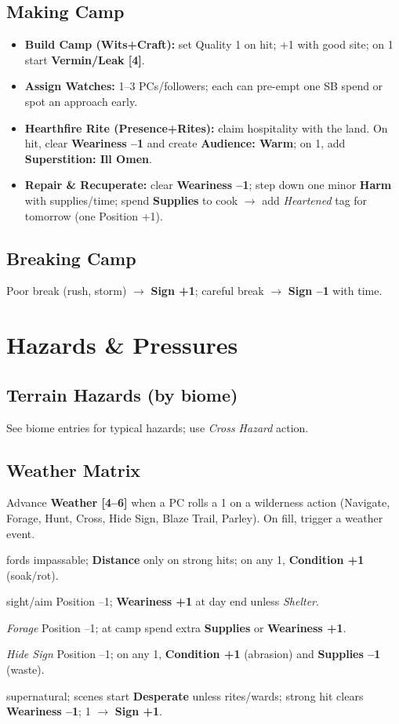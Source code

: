 \documentclass[11pt]{article}
\begin{document}
\subsection{Making Camp}
\begin{itemize}
  \item \textbf{Build Camp (Wits+Craft):} set Quality 1 on hit; +1 with good site; on 1 start \textbf{Vermin/Leak [4]}.
  \item \textbf{Assign Watches:} 1--3 PCs/followers; each can pre-empt one SB spend or spot an approach early.
  \item \textbf{Hearthfire Rite (Presence+Rites):} claim hospitality with the land. On hit, clear \textbf{Weariness --1} and create \textbf{Audience: Warm}; on 1, add \textbf{Superstition: Ill Omen}.
  \item \textbf{Repair \& Recuperate:} clear \textbf{Weariness --1}; step down one minor \textbf{Harm} with supplies/time; spend \textbf{Supplies} to cook $\to$ add \emph{Heartened} tag for tomorrow (one Position +1).
\end{itemize}

\subsection{Breaking Camp}
Poor break (rush, storm) $\to$ \textbf{Sign +1}; careful break $\to$ \textbf{Sign --1} with time.

\section{Hazards \& Pressures}
\subsection{Terrain Hazards (by biome)}
See biome entries for typical hazards; use \emph{Cross Hazard} action.

\subsection{Weather Matrix}\label{sec:weather}
Advance \textbf{Weather [4--6]} when a PC rolls a 1 on a wilderness action (Navigate, Forage, Hunt, Cross, Hide Sign, Blaze Trail, Parley). On fill, trigger a weather event.

\begin{description}[leftmargin=1.2em]
  \item[Rain/Monsoon] fords impassable; \textbf{Distance} only on strong hits; on any 1, \textbf{Condition +1} (soak/rot).
  \item[Snow/Whiteout] sight/aim Position --1; \textbf{Weariness +1} at day end unless \emph{Shelter}.
  \item[Heat/Dry] \emph{Forage} Position --1; at camp spend extra \textbf{Supplies} or \textbf{Weariness +1}.
  \item[Dust/Sand] \emph{Hide Sign} Position --1; on any 1, \textbf{Condition +1} (abrasion) and \textbf{Supplies --1} (waste).
  \item[Ward-Storm] supernatural; scenes start \textbf{Desperate} unless rites/wards; strong hit clears \textbf{Weariness --1}; 1 $\to$ \textbf{Sign +1}.
\end{description}
\end{document}
